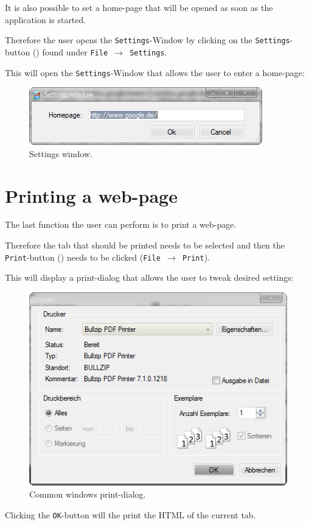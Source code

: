 It is also possible to set a home-page that will be opened as soon as the application is started.

Therefore the user opens the \texttt{Settings}-Window by clicking on the \texttt{Settings}-button () found under \texttt{File $\rightarrow$ Settings}.

This will open the \texttt{Settings}-Window that allows the user to enter a home-page:

\begin{figure}[H]
\begin{center}
\includegraphics[scale=1]{gfx/settings_menu.png}
\caption{Settings window.}
\label{fig:settings_window}
\end{center}
\end{figure}

\section{Printing a web-page}
\label{sec:printing_web_page}

The last function the user can perform is to print a web-page.

Therefore the tab that should be printed needs to be selected and then the \texttt{Print}-button () needs to be clicked (\texttt{File $\rightarrow$ Print}).

This will display a print-dialog that allows the user to tweak desired settings:

\begin{figure}[H]
\begin{center}
\includegraphics[scale=1]{gfx/print_dialog.png}
\caption{Common windows print-dialog.}
\label{fig:print_dialog}
\end{center}
\end{figure}

Clicking the \texttt{OK}-button will the print the \ac{HTML} of the current tab.

